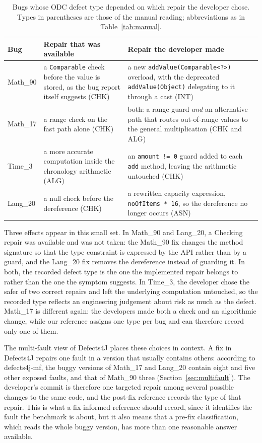 \documentclass{iutbscthesis}
\begin{document}
\begin{table}[!htbp]
    \centering
    \small
    \begin{tabular}{l p{5.0cm} p{5.4cm}}
        \toprule
        \textbf{Bug} & \textbf{Repair that was available} & \textbf{Repair the developer made} \\
        \midrule
        Math\_90  & a \texttt{Comparable} check before the value is stored, as the bug report itself suggests (CHK) & a new \texttt{add\allowbreak Value(Comparable<?>)} overload, with the deprecated \texttt{add\allowbreak Value(Object)} delegating to it through a cast (INT) \\
        Math\_17  & a range check on the fast path alone (CHK) & both: a range guard \emph{and} an alternative path that routes out-of-range values to the general multiplication (CHK and ALG) \\
        Time\_3   & a more accurate computation inside the chronology arithmetic (ALG) & an \texttt{amount != 0} guard added to each \texttt{add} method, leaving the arithmetic untouched (CHK) \\
        Lang\_20  & a null check before the dereference (CHK) & a rewritten capacity expression, \texttt{no\allowbreak Of\allowbreak Items * 16}, so the dereference no longer occurs (ASN) \\
        \bottomrule
    \end{tabular}
    \caption{Bugs whose ODC defect type depended on which repair the developer chose. Types in parentheses are those of the manual reading; abbreviations as in Table~\ref{tab:manual}.}
    \label{tab:repair_choice}
\end{table}

Three effects appear in this small set. In Math\_90 and Lang\_20, a Checking repair was available and was not taken: the Math\_90 fix changes the method signature so that the type constraint is expressed by the API rather than by a guard, and the Lang\_20 fix removes the dereference instead of guarding it. In both, the recorded defect type is the one the implemented repair belongs to rather than the one the symptom suggests. In Time\_3, the developer chose the safer of two correct repairs and left the underlying computation untouched, so the recorded type reflects an engineering judgement about risk as much as the defect. Math\_17 is different again: the developers made both a check and an algorithmic change, while our reference assigns one type per bug and can therefore record only one of them.

The multi-fault view of Defects4J \cite{callaghan2024mf} places these choices in context. A fix in Defects4J repairs one fault in a version that usually contains others: according to defects4j-mf, the buggy versions of Math\_17 and Lang\_20 contain eight and five other exposed faults, and that of Math\_90 three (Section~\ref{sec:multifault}). The developer's commit is therefore one targeted repair among several possible changes to the same code, and the post-fix reference records the type of that repair. This is what a fix-informed reference should record, since it identifies the fault the benchmark is about, but it also means that a pre-fix classification, which reads the whole buggy version, has more than one reasonable answer available.
\end{document}
